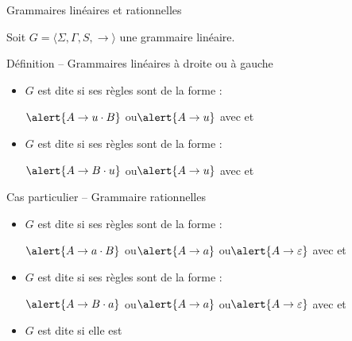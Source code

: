 
\begingroup

\begin{frame}{Grammaires linéaires et rationnelles}

  Soit \alert{$G = \langle \Sigma, \Gamma, S, \rightarrow \rangle$} une grammaire linéaire. 

  \begin{block}{Définition -- Grammaires linéaires à droite ou à gauche}
    \begin{itemize}
    \item $G$ est dite  si ses règles sont de la forme :
      \begin{center}
        $\alert{A \rightarrow u \cdot B}$ \quad ou\quad $\alert{A \rightarrow u}$ \quad avec  et 
      \end{center}
    \item $G$ est dite  si ses règles sont de la forme :
      \begin{center}
        $\alert{A \rightarrow B \cdot u}$ \quad ou\quad $\alert{A \rightarrow u}$ \quad avec  et 
      \end{center}
    \end{itemize}
  \end{block}

  \begin{block}{Cas particulier -- Grammaire rationnelles}
    \begin{itemize}
    \item $G$ est dite  si ses règles sont de la forme :
      \begin{center}
        $\alert{A \rightarrow a \cdot B}$ \quad ou\quad $\alert{A \rightarrow a}$ \quad ou\quad $\alert{A \rightarrow \varepsilon}$
        \quad avec  et 
      \end{center}
    \item $G$ est dite  si ses règles sont de la forme :
      \begin{center}
        $\alert{A \rightarrow B \cdot a}$ \quad ou\quad $\alert{A \rightarrow a}$ \quad ou\quad $\alert{A \rightarrow \varepsilon}$
        \quad avec  et 
      \end{center}
    \item $G$ est dite  si elle est 
    \end{itemize}
  \end{block}
  
\end{frame}

\endgroup
